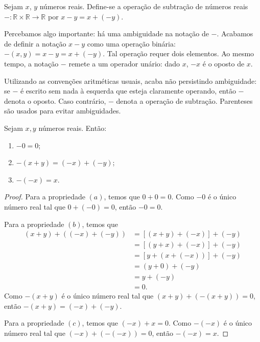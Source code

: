 \begin{definition}
    Sejam $x$, $y$ números reais.
    Define-se a operação de subtração de números reais $-: \mathbb R\times \mathbb R\to \mathbb R$ por $x-y = x+(-y)$.
\end{definition}

Percebamos algo importante: há uma ambiguidade na notação de $-$.
Acabamos de definir a notação $x-y$ como uma operação binária: $-(x, y)=x-y=x+(-y)$.
Tal operação requer dois elementos.
Ao mesmo tempo, a notação $-$ remete a um operador unário: dado $x$, $-x$ é o oposto de $x$.

Utilizando as convenções aritméticas usuais, acaba não persistindo ambiguidade: se $-$ é escrito sem nada à esquerda que esteja claramente operando, então $-$ denota o oposto.
Caso contrário, $-$ denota a operação de subtração.
Parenteses são usados para evitar ambiguidades.

\begin{proposition}
    Sejam $x, y$ números reais.
    Então:
    \begin{enumerate}[label=(\alph*)]
        \item $-0=0$;
        \item $-(x+y)=(-x)+(-y)$;
        \item $-(-x)=x$.
    \end{enumerate}
\end{proposition}
\begin{proof}
    Para a propriedade $(a)$, temos que $0+0=0$. Como $-0$ é o único número real tal que $0+(-0)=0$, então $-0=0$.

    Para a propriedade $(b)$, temos que
    \begin{align*}
    (x+y)+((-x)+(-y)) &= [(x+y)+(-x)]+(-y) \tag{propriedade associativa} \\
    &= [(y+x)+(-x)]+(-y) \tag{propriedade comutativa} \\
    &= [y+(x+(-x))]+(-y) \tag{propriedade associativa} \\
    &= (y+0)+(-y) \tag{pela definição de oposto} \\
    &= y+(-y) \tag{0 é neutro da soma} \\
    &= 0. \tag{pela definição de oposto}
    \end{align*}
    Como $-(x+y)$ é o único número real tal que $(x+y)+(-(x+y))=0$, então $-(x+y)=(-x)+(-y)$.

    Para a propriedade $(c)$, temos que $(-x)+x=0$.
    Como $-(-x)$ é o único número real tal que $(-x)+(-(-x))=0$, então $-(-x)=x$.
\end{proof}

